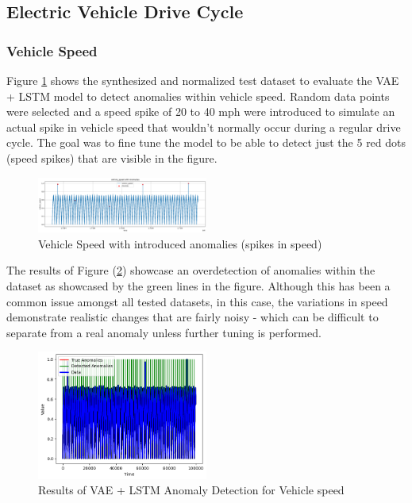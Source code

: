 \documentclass[conference]{IEEEtran}
\begin{document}
\subsection{Electric Vehicle Drive Cycle}
\subsubsection{Vehicle Speed}
Figure \ref{aj_fig__3} shows the synthesized and normalized test dataset to evaluate the VAE + LSTM model to detect anomalies within vehicle speed. Random data points were selected and a speed spike of 20 to 40 mph were introduced to simulate an actual spike in vehicle speed that wouldn’t normally occur during a regular drive cycle. The goal was to fine tune the model to be able to detect just the 5 red dots (speed spikes) that are visible in the figure.

\begin{figure}[htbp]
    \centering
    \includegraphics[width=0.5\textwidth]{aj_fig_3.png}
    \caption{Vehicle Speed with introduced anomalies (spikes in speed)}
    \label{aj_fig__3}
\end{figure}

The results of Figure (\ref{aj_fig__4}) showcase an overdetection of anomalies within the dataset as showcased by the green lines in the figure. Although this has been a common issue amongst all tested datasets, in this case, the variations in speed demonstrate realistic changes that are fairly noisy - which can be difficult to separate from a real anomaly unless further tuning is performed. 

\begin{figure}[htbp]
    \centering
    \includegraphics[width=0.5\textwidth]{aj_fig_4.png}
    \caption{Results of VAE + LSTM Anomaly Detection for Vehicle speed}
    \label{aj_fig__4}
\end{figure}
\end{document}
